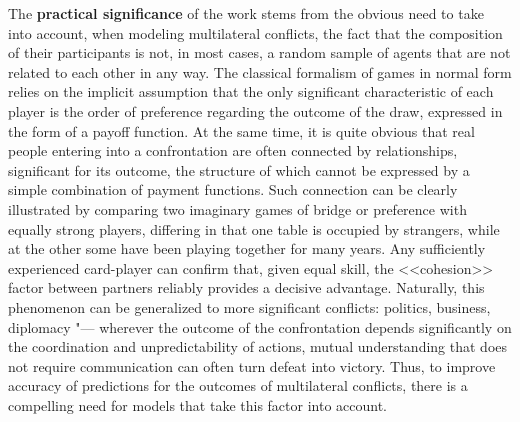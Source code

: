 The \textbf{practical significance} of the work stems from the obvious need to take into account, when modeling multilateral conflicts, the fact that the composition of their participants is not, in most cases, a random sample of agents that are not related to each other in any way. The classical formalism of games in normal form relies on the implicit assumption that the only significant characteristic of each player is the order of preference regarding the outcome of the draw, expressed in the form of a payoff function. At the same time, it is quite obvious that real people entering into a confrontation are often connected by relationships, significant for its outcome, the structure of which cannot be expressed by a simple combination of payment functions. Such connection can be clearly illustrated by comparing two imaginary games of bridge or preference with equally strong players, differing in that one table is occupied by strangers, while at the other some have been playing together for many years. Any sufficiently experienced card-player can confirm that, given equal skill, the <<cohesion>> factor between partners reliably provides a decisive advantage. Naturally, this phenomenon can be generalized to more significant conflicts: politics, business, diplomacy "--- wherever the outcome of the confrontation depends significantly on the coordination and unpredictability of actions, mutual understanding that does not require communication can often turn defeat into victory. Thus, to improve accuracy of predictions for the outcomes of multilateral conflicts, there is a compelling need for models that take this factor into account. %

